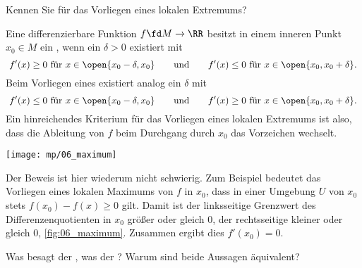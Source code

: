 \begin{frage}
Kennen Sie   für das Vorliegen eines 
lokalen Extremums?
\end{frage}

\begin{antwort}
Eine differenzierbare Funktion $f \fd M\to \RR$ besitzt in einem  
inneren Punkt $x_0 \in M$ ein , wenn ein 
$\delta > 0$ existiert mit 
\[
\text{
$f'(x) \ge 0$ für $x\in \open{x_0-\delta,x_0}$\qquad und\qquad
$f'(x) \le 0$ für $x\in \open{x_0,x_0+\delta}.$ }
\]
Beim Vorliegen eines  existiert analog ein 
$\delta$ mit 
\[
\text{
$f'(x) \le 0$ für $x\in \open{x_0-\delta,x_0}$\qquad und\qquad
$f'(x) \ge 0$ für $x\in \open{x_0,x_0+\delta}.$ }
\]
Ein hinreichendes Kriterium für das Vorliegen eines lokalen 
Extremums ist also, dass die 
Ableitung von $f$ beim Durchgang durch $x_0$ das Vorzeichen wechselt. 

\begin{center}
  \texttt{[image: mp/06\_maximum]}
  \label{fig:06_maximum}
\end{center}

Der Beweis ist hier wiederum nicht schwierig. 
Zum Beispiel bedeutet das Vorliegen eines lokalen Maximums 
von $f$ in $x_0$, dass in einer Umgebung $U$ von $x_0$ 
stets $f(x_0)-f(x) \ge 0$ gilt. Damit ist der 
linksseitige Grenzwert des Differenzenquotienten in $x_0$ 
größer oder gleich $0$, 
der rechtsseitige kleiner 
oder gleich $0$, \sieheAbbildung\ref{fig:06_maximum}. 
Zusammen ergibt dies $f'(x_0)=0$.   
\AntEnd
\end{antwort}


\begin{frage}\label{06_rolle}
Was besagt der , was der 
? Warum sind 
beide Aussagen äquivalent?
\end{frage} 


